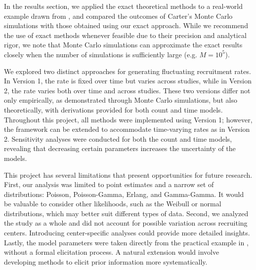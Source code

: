 In the results section, we applied the exact theoretical methods to a real-world example drawn from \cite{carter2004application}, and compared the outcomes of Carter's Monte Carlo simulations with those obtained using our exact approach. While we recommend the use of exact methods whenever feasible due to their precision and analytical rigor, we note that Monte Carlo simulations can approximate the exact results closely when the number of simulations is sufficiently large (e.g. $M=10^5$).

We explored two distinct approaches for generating fluctuating recruitment rates. In Version 1, the rate is fixed over time but varies across studies, while in Version 2, the rate varies both over time and across studies. These two versions differ not only empirically, as demonstrated through Monte Carlo simulations, but also theoretically, with derivations provided for both count and time models. Throughout this project, all methods were implemented using Version 1; however, the framework can be extended to accommodate time-varying rates as in Version 2. Sensitivity analyses were conducted for both the count and time models, revealing that decreasing certain parameters increases the uncertainty of the models.

This project has several limitations that present opportunities for future research. First, our analysis was limited to point estimates and a narrow set of distributions: Poisson, Poisson-Gamma, Erlang, and Gamma-Gamma. It would be valuable to consider other likelihoods, such as the Weibull or normal distributions, which may better suit different types of data. Second, we analyzed the study as a whole and did not account for possible variation across recruiting centers. Introducing center-specific analyses could provide more detailed insights. Lastly, the model parameters were taken directly from the practical example in \cite{carter2004application}, without a formal elicitation process. A natural extension would involve developing methods to elicit prior information more systematically.

